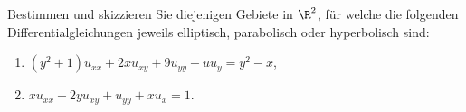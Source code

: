 
\begin{exercise}

Bestimmen und skizzieren Sie diejenigen Gebiete in $\R^2$, für welche die folgenden Differentialgleichungen jeweils elliptisch, parabolisch oder hyperbolisch sind:

\begin{enumerate}[label = (\roman*)]
    \item $(y^2 + 1) u_{xx} + 2 x u_{xy} + 9 u_{yy} - u u_y = y^2 - x$,
    \item $x u_{xx} + 2 y u_{xy} + u_{yy} + x u_x = 1$.
\end{enumerate}

\end{exercise}


